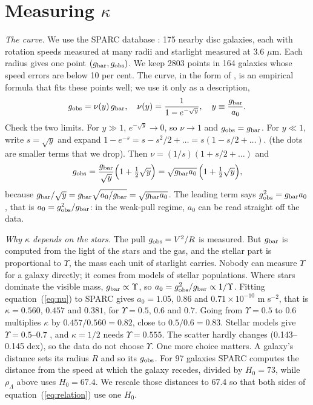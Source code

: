 \documentclass[fleqn,usenatbib]{mnras}
\begin{document}
\section{Measuring $\kappa$}
\label{sec:kappa}
\emph{The curve.} We use the SPARC database \citep{Lelli2016}: 175 nearby disc galaxies, each with rotation speeds measured at many radii and starlight measured at 3.6 $\mu$m. Each radius gives one point $(g_{\rm bar},g_{\rm obs})$. We keep 2803 points in 164 galaxies whose speed errors are below 10 per cent. The curve, in the form of \citet{McGaugh2016}, is an empirical formula that fits these points well; we use it only as a description,
\begin{equation}
g_{\rm obs}=\nu(y)\,g_{\rm bar},\quad \nu(y)=\frac{1}{1-e^{-\sqrt y}},\quad y\equiv\frac{g_{\rm bar}}{a_0}.
\label{eq:nu}
\end{equation}
Check the two limits. For $y\gg1$, $e^{-\sqrt y}\to0$, so $\nu\to1$ and $g_{\rm obs}=g_{\rm bar}$. For $y\ll1$, write $s=\sqrt y$ and expand $1-e^{-s}=s-s^2/2+\dots=s(1-s/2+\dots)$. (the dots are smaller terms that we drop). Then $\nu=(1/s)(1+s/2+\dots)$ and
\begin{equation}
g_{\rm obs}=\frac{g_{\rm bar}}{\sqrt y}\Big(1+\tfrac12\sqrt y\Big)=\sqrt{g_{\rm bar}a_0}\,\Big(1+\tfrac12\sqrt y\Big),
\label{eq:deep}
\end{equation}
because $g_{\rm bar}/\sqrt y=g_{\rm bar}\sqrt{a_0/g_{\rm bar}}=\sqrt{g_{\rm bar}a_0}$. The leading term says $g_{\rm obs}^2=g_{\rm bar}a_0$, that is $a_0=g_{\rm obs}^2/g_{\rm bar}$: in the weak-pull regime, $a_0$ can be read straight off the data.

\emph{Why $\kappa$ depends on the stars.} The pull $g_{\rm obs}=V^2/R$ is measured. But $g_{\rm bar}$ is computed from the light of the stars and the gas, and the stellar part is proportional to $\Upsilon$, the mass each unit of starlight carries. Nobody can measure $\Upsilon$ for a galaxy directly; it comes from models of stellar populations. Where stars dominate the visible mass, $g_{\rm bar}\propto\Upsilon$, so $a_0=g_{\rm obs}^2/g_{\rm bar}\propto1/\Upsilon$. Fitting equation~(\ref{eq:nu}) to SPARC gives $a_0=1.05$, $0.86$ and $0.71\times10^{-10}$ m s$^{-2}$, that is $\kappa=0.560$, $0.457$ and $0.381$, for $\Upsilon=0.5$, $0.6$ and $0.7$. Going from $\Upsilon=0.5$ to $0.6$ multiplies $\kappa$ by $0.457/0.560=0.82$, close to $0.5/0.6=0.83$. Stellar models give $\Upsilon=0.5$--$0.7$ \citep{Meidt2014}, and $\kappa=1/2$ needs $\Upsilon=0.555$. The scatter hardly changes (0.143--0.145 dex), so the data do not choose $\Upsilon$. One more choice matters. A galaxy's distance sets its radius $R$ and so its $g_{\rm obs}$. For 97 galaxies SPARC computes the distance from the speed at which the galaxy recedes, divided by $H_0=73$, while $\rho_\Lambda$ above uses $H_0=67.4$. We rescale those distances to 67.4 so that both sides of equation~(\ref{eq:relation}) use one $H_0$.
\end{document}
